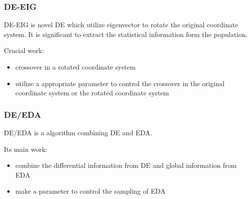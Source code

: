 \documentclass[xcolor=dvipsnames]{beamer}
\begin{document}
    \begin{frame}
    \frametitle{DE-EIG}
    DE-EIG is novel DE which utilize eigenvector to rotate the original coordinate system. It is significant to extract the statistical information form the population.
    \begin{block}{Crucial work:}
    \begin{itemize}
    \item crossover in a rotated coordinate system
    \item utilize a appropriate parameter to control the crossover in the original coordinate system or the rotated coordinate system
    \end{itemize}
    \end{block}
    \end{frame}

    \begin{frame}
    \frametitle{DE/EDA}
    DE/EDA is a algorithm combining DE and EDA.

    Its main work:
    \begin{itemize}
    \item combine the differential information from DE and global information from EDA
    \item make a parameter to control the sampling of EDA
    \end{itemize}
    \end{frame}
\end{document}
